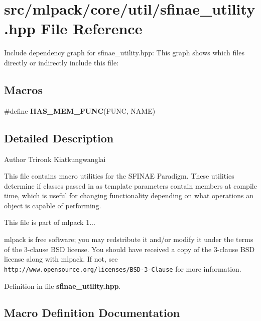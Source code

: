 \section{src/mlpack/core/util/sfinae\-\_\-utility.hpp File Reference}
\label{sfinae__utility_8hpp}
Include dependency graph for sfinae\-\_\-utility.\-hpp\-:
This graph shows which files directly or indirectly include this file\-:
\subsection*{Macros}
\begin{DoxyCompactItemize}
\item 
\#define {\bf H\-A\-S\-\_\-\-M\-E\-M\-\_\-\-F\-U\-N\-C}(F\-U\-N\-C, N\-A\-M\-E)
\end{DoxyCompactItemize}


\subsection{Detailed Description}
\begin{DoxyAuthor}{Author}
Trironk Kiatkungwanglai
\end{DoxyAuthor}
This file contains macro utilities for the S\-F\-I\-N\-A\-E Paradigm. These utilities determine if classes passed in as template parameters contain members at compile time, which is useful for changing functionality depending on what operations an object is capable of performing.

This file is part of mlpack 1...

mlpack is free software; you may redstribute it and/or modify it under the terms of the 3-\/clause B\-S\-D license. You should have received a copy of the 3-\/clause B\-S\-D license along with mlpack. If not, see {\tt http\-://www.\-opensource.\-org/licenses/\-B\-S\-D-\/3-\/\-Clause} for more information. 

Definition in file {\bf sfinae\-\_\-utility.\-hpp}.



\subsection{Macro Definition Documentation}

